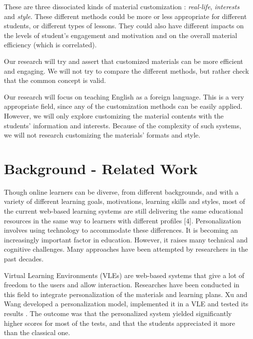 \documentclass[a4paper,12pt]{article}
\begin{document}
These are three dissociated kinds of material customization : \textit{real-life}, \textit{interests} and \textit{style}. These different methods could be more or less appropriate for different students, or different types of lessons. They could also have different impacts on the levels of student’s engagement and motivation and on the overall material efficiency (which is correlated).

Our research will try and assert that customized materials can be more efficient and engaging. We will not try to compare the different methods, but rather check that the common concept is valid.

Our research will focus on teaching English as a foreign language. This is a very appropriate field, since any of the customization methods can be easily applied. However, we will only explore customizing the material contents with the students' information and interests. Because of the complexity of such systems, we will not research customizing the materials' formats and style.


\section{Background - Related Work}

Though online learners can be diverse, from different backgrounds, and with a variety of different learning goals, motivations, learning skills and styles, most of the current web-based learning systems are still delivering the same educational resources in the same way to learners with different profiles [4]. Personalization involves using technology to accommodate these differences. It is becoming an increasingly important factor in education. However, it raises many technical and cognitive challenges. Many approaches have been attempted by researchers in the past decades.

Virtual Learning Environments (VLEs) are web-based systems that give a lot of freedom to the users and allow interaction. Researches have been conducted in this field to integrate personalization of the materials and learning plans. Xu and Wang developed a personalization model, implemented it in a VLE and tested its results \cite{xu_vle}. The outcome was that the personalized system yielded significantly higher scores for most of the tests, and that the students appreciated it more than the classical one.
\end{document}
